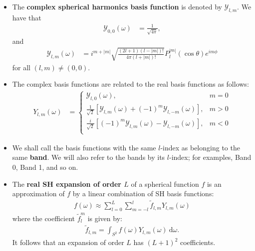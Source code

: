 \documentclass[10pt]{article}
\newcommand{\dee}{\mathrm{d}}
\begin{document}
\begin{itemize}
        \item The \textbf{complex spherical harmonics basis function} is denoted by $\mathcal{Y}_{l,m}$.  We have that
        \begin{align*}
            \mathcal{Y}_{0,0}(\omega) &= \frac{1}{\sqrt{4\pi}},
        \end{align*}
        and
        \begin{align*}
            \mathcal{Y}_{l,m}(\omega) &= i^{m+|m|} \sqrt{\frac{(2l+1)(l-|m|)!}{4\pi(l+|m|)!}} P_l^{|m|}(\cos\theta) e^{im\phi}
        \end{align*}
        for all $(l,m) \neq (0,0)$.

        \item The complex basis functions are related to the real basis functions as follows:
        \begin{align*}
            Y_{l,m}(\omega) &= \begin{cases}
                \mathcal{Y}_{l,0}(\omega), & m=0 \\
                \frac{1}{\sqrt{2}}[\mathcal{Y}_{l,m}(\omega) + (-1)^m \mathcal{Y}_{l,-m}(\omega)] , & m>0 \\
                \frac{i}{\sqrt{2}}[(-1)^m \mathcal{Y}_{l,m}(\omega) - \mathcal{Y}_{l,-m}(\omega)] , & m<0 \\
            \end{cases}
        \end{align*}

        \item We shall call the basis functions with the same $l$-index as belonging to the same \textbf{band}.  We will also refer to the bands by its $l$-index; for examples, Band 0, Band 1, and so on.

        \item The \textbf{real SH expansion of order $L$} of a spherical function $f$ is an approximation of $f$ by a linear combination of SH basis functions:
        \begin{align*}
            f(\omega) \approx \sum_{l=0}^L \sum_{m=-l}^l \tilde{f}_{l,m} Y_{l,m}(\omega)
        \end{align*}
        where the coefficient $\tilde{f}^m_l$ is given by:
        \begin{align*}
            \tilde{f}_{l,m} = \int_{S^2} f(\omega) Y_{l,m}(\omega)\ \dee\omega.
        \end{align*}
        It follows that an expansion of order $L$ has $(L+1)^2$ coefficients.              
	\end{itemize}
\end{document}
